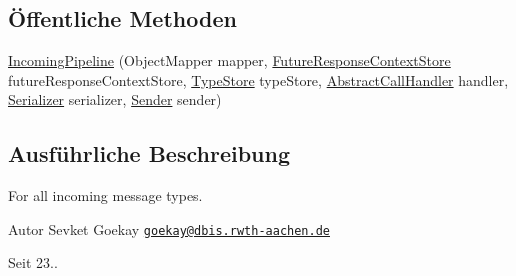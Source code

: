 \subsection*{Öffentliche Methoden}
\begin{DoxyCompactItemize}
\item 
\hyperlink{classde_1_1rwth_1_1idsg_1_1steve_1_1ocpp_1_1ws_1_1pipeline_1_1_incoming_pipeline_a0f80c5d9642b1f81d599a70778d6abbe}{Incoming\+Pipeline} (Object\+Mapper mapper, \hyperlink{interfacede_1_1rwth_1_1idsg_1_1steve_1_1ocpp_1_1ws_1_1_future_response_context_store}{Future\+Response\+Context\+Store} future\+Response\+Context\+Store, \hyperlink{interfacede_1_1rwth_1_1idsg_1_1steve_1_1ocpp_1_1ws_1_1_type_store}{Type\+Store} type\+Store, \hyperlink{classde_1_1rwth_1_1idsg_1_1steve_1_1ocpp_1_1ws_1_1pipeline_1_1_abstract_call_handler}{Abstract\+Call\+Handler} handler, \hyperlink{classde_1_1rwth_1_1idsg_1_1steve_1_1ocpp_1_1ws_1_1pipeline_1_1_serializer}{Serializer} serializer, \hyperlink{classde_1_1rwth_1_1idsg_1_1steve_1_1ocpp_1_1ws_1_1pipeline_1_1_sender}{Sender} sender)
\end{DoxyCompactItemize}


\subsection{Ausführliche Beschreibung}
For all incoming message types.

\begin{DoxyAuthor}{Autor}
Sevket Goekay \href{mailto:goekay@dbis.rwth-aachen.de}{\tt goekay@dbis.\+rwth-\/aachen.\+de} 
\end{DoxyAuthor}
\begin{DoxySince}{Seit}
23.. 
\end{DoxySince}


